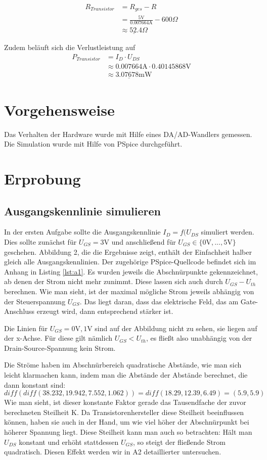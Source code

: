 \documentclass[12pt,a4paper]{scrartcl}
\begin{document}
\begin{align*}
R_{Transistor} & = R_{ges} - R \\
& = \frac{5\text{V}}{0.007664\text{A}} - 600\Omega\\
& \underline{\approx 52.4\Omega}
\end{align*}

Zudem bel\"auft sich die Verlustleistung auf 
\begin{align*}
P_{Transistor} & = I_D \cdot U_{DS} \\
& \approx 0.007664\text{A} \cdot 0.40145868\text{V} \\
& \underline{\approx 3.07678\text{mW}}
\end{align*}

\section{Vorgehensweise}
Das Verhalten der Hardware wurde mit Hilfe eines DA/AD-Wandlers gemessen.
Die Simulation wurde mit Hilfe von PSpice durchgef\"uhrt.

\section{Erprobung}
\subsection{Ausgangskennlinie simulieren}
In der ersten Aufgabe sollte die Ausgangskennlinie $I_D = f(U_{DS}$ simuliert werden.
Dies sollte zun\"achst f\"ur $U_{GS} = 3$V und anschlie\ss end f\"ur $U_{GS} \in \{0\text{V}, ..., 5\text{V}\}$ geschehen.
Abbildung 2, die die Ergebnisse zeigt, enth\"alt der Einfachheit halber gleich alle Ausgangskennlinien.
Der zugeh\"orige PSpice-Quellcode befindet sich im Anhang in Listing \ref{lst:a1}.
Es wurden jeweils die Abschn\"urpunkte gekennzeichnet, ab denen der Strom nicht mehr zunimmt.
Diese lassen sich auch durch $U_{GS}-U_{th}$ berechnen.
Wie man sieht, ist der maximal m\"ogliche Strom jeweils abh\"angig von der Steuerspannung $U_{GS}$.
Das liegt daran, dass das elektrische Feld, das am Gate-Anschluss erzeugt wird, dann entsprechend st\"arker ist.

Die Linien f\"ur $U_{GS} = 0\text{V}, 1$V sind auf der Abbildung nicht zu sehen, sie liegen auf der x-Achse.
F\"ur diese gilt n\"amlich $U_{GS} < U_{th}$, es flie\ss t also unabh\"angig von der Drain-Source-Spannung kein Strom.

Die Str\"ome haben im Abschn\"urbereich quadratische Abst\"ande, wie man sich leicht klarmachen kann, indem man die Abst\"ande der Abst\"ande berechnet, die dann konstant sind:
$$diff(diff(38.232, 19.942, 7.552, 1.062)) = diff(18.29, 12.39, 6.49) = (5.9, 5.9)$$
Wie man sieht, ist dieser konstante Faktor gerade das Tausendfache der zuvor berechneten Steilheit K.
Da Transistorenhersteller diese Steilheit beeinflussen k\"onnen, haben sie auch in der Hand, um wie viel h\"oher der Abschn\"urpunkt bei h\"oherer Spannung liegt.
Diese Steilheit kann man auch so betrachten:
H\"alt man $U_{DS}$ konstant und erh\"oht stattdessen $U_{GS}$, so steigt der flie\ss ende Strom quadratisch.
Diesen Effekt werden wir in A2 detaillierter untersuchen.
\end{document}
